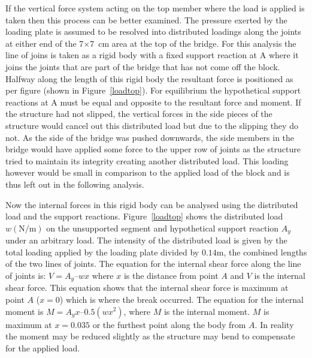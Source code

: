 \documentclass[12pt]{article}
\begin{document}
If the vertical force system acting on the top member where the load is applied is taken then this process can be better examined. The pressure exerted by the loading plate is assumed to be resolved into distributed loadings along the joints at either end of the 7$\times$7~cm area at the top of the bridge. For this analysis the line of joins is taken as a rigid body with a fixed support reaction at A where it joins the joints that are part of the bridge that has not come off the block. Halfway along the length of this rigid body the resultant force is positioned as per figure (shown in Figure~\ref{loadtop}).  For equilibrium the hypothetical support reactions at A must be equal and opposite to the resultant force and moment. If the structure had not slipped, the vertical forces in the side pieces of the structure would cancel out this distributed load but due to the slipping they do not. As the side of the bridge was pushed downwards, the side members in the bridge would have applied some force to the upper row of joints as the structure tried to maintain its integrity creating another distributed load. This loading however would be small in comparison to the applied load of the block and is thus left out in the following analysis.

Now the internal forces in this rigid body can be analysed using the distributed load and the support reactions.  Figure~\ref{loadtop} shows the distributed load $w \mathrm{(N/m)}$ on the unsupported segment and hypothetical support reaction $A_y$ under an arbitrary load. The intensity of the distributed load is given by the total loading applied by the loading plate divided by $0.14\mathrm{m}$, the combined lengths of the two lines of joints. The equation for the internal shear force along the line of joints is: $V=A_y–wx$ where $x$ is the distance from point $A$ and $V$ is the internal shear force. This equation shows that the internal shear force is maximum at point $A$ ($x=0$) which is where the break occurred. The equation for the internal moment is $M = A_yx –0.5(wx^2)$, where $M$ is the internal moment. $M$ is maximum at $x = 0.035$ or the furthest point along the body from $A$. In reality the moment may be reduced slightly as the structure may bend to compensate for the applied load.
\end{document}
